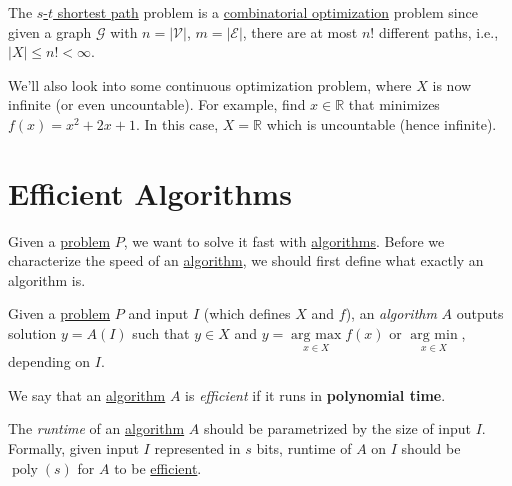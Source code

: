 \begin{eg}
	The \hyperref[eg:s-t-path]{\(s\)-\(t\) shortest path} problem is a \hyperref[def:combinatorial-optimization]{combinatorial optimization} problem since given a graph \(\mathcal{G} \) with \(n = \left\vert \mathcal{V}  \right\vert \), \(m = \left\vert \mathcal{E}  \right\vert \), there are at most \(n!\) different paths, i.e., \(\left\vert X \right\vert \leq n! < \infty\).
\end{eg}

\begin{note}
	We'll also look into some continuous optimization problem, where \(X\) is now infinite (or even uncountable). For example, find \(x\in \mathbb{R} \) that minimizes \(f(x)=x^{2} +2x + 1\). In this case, \(X = \mathbb{R} \) which is uncountable (hence infinite).
\end{note}

\section{Efficient Algorithms}

Given a \hyperref[def:computational-problem]{problem} \(P\), we want to solve it fast with \hyperref[def:algorithm]{algorithms}. Before we characterize the speed of an \hyperref[def:algorithm]{algorithm}, we should first define what exactly an algorithm is.

\begin{definition}[Algorithm]\label{def:algorithm}
	Given a \hyperref[def:computational-problem]{problem} \(P\) and input \(I\) (which defines \(X\) and \(f\)), an \emph{algorithm} \(A\) outputs solution \(y = A(I)\) such that \(y\in X\) and \(y = \underset{x\in X}{\mathop{\arg\ \max}} f(x)\) or \(\underset{x\in X}{\mathop{\arg\ \min}} \), depending on \(I\).
\end{definition}

\begin{definition}[Efficient]\label{def:efficient}
	We say that an \hyperref[def:algorithm]{algorithm} \(A\) is \emph{efficient} if it runs in \textbf{polynomial time}.
\end{definition}

\begin{remark}
	The \emph{runtime} of an \hyperref[def:algorithm]{algorithm} \(A\) should be parametrized by the size of input \(I\). Formally, given input \(I\) represented in \(s\) bits, runtime of \(A\) on \(I\) should be \(\mathop{\mathrm{poly}}(s)\) for \(A\) to be \hyperref[def:efficient]{efficient}.
\end{remark}


